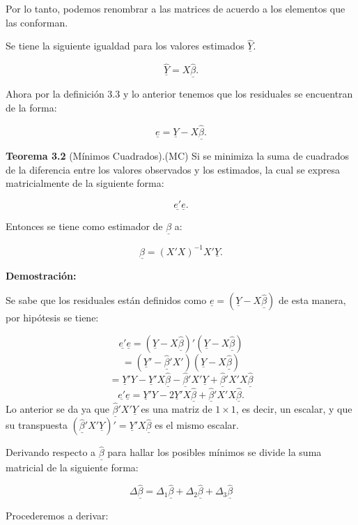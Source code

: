\documentclass[
  a4paper,
  oneside,
  openany]{book}
\begin{document}
Por lo tanto, podemos renombrar a las matrices de acuerdo a los elementos que las conforman.

Se tiene la siguiente igualdad para los valores estimados \(\underline{\hat{Y}}.\)

\[\underline{\hat{Y}}=X \underline{\hat{\beta}}.\]

Ahora por la definición 3.3 y lo anterior tenemos que los residuales se encuentran de la forma:

\[\underline{e}=\underline{Y}-X \underline{\hat{\beta}}.\]

\textbf{Teorema 3.2} (Mínimos Cuadrados).(MC) Si se minimiza la suma de cuadrados de la diferencia entre los valores observados y los estimados, la cual se expresa matricialmente de la siguiente forma:

\[\underline{e'}\underline{e}.\]

Entonces se tiene como estimador de \(\underline{\beta}\) a:

\[\underline{\hat{\beta}}=\left( X'X\right)^{-1}X'\underline{Y}.\]

\textbf{Demostración:}

Se sabe que los residuales están definidos como \(\underline{e}=\left( \underline{Y}-X \underline{\hat{\beta}}\right)\) de esta manera, por hipótesis se tiene:

\[\underline{e'}\underline{e}=\left( \underline{Y}-X \underline{\hat{\beta}}\right)'\left( \underline{Y}-X \underline{\hat{\beta}}\right)\]
\[=\left(\underline{Y}'- \underline{\hat{\beta}}'X'\right)\left( \underline{Y}-X \underline{\hat{\beta}}\right)\]
\[=\underline{Y}'Y-\underline{Y}'X\underline{\hat{\beta}}-\underline{\hat{\beta}}'X'\underline{Y}+\underline{\hat{\beta}}'X'X\underline{\hat{\beta}}\]
\[\underline{e'}\underline{e}=\underline{Y}'Y-2\underline{Y}'X\underline{\hat{\beta}}+\underline{\hat{\beta}}'X'X\underline{\hat{\beta}}.\]
Lo anterior se da ya que \(\underline{\hat{\beta}}'X'\underline{Y}\) es una matriz de \(1\times 1\), es decir, un escalar, y que su transpuesta \((\underline{\hat{\beta}}'X'\underline{Y})'=\underline{Y}'X\underline{\hat{\beta}}\) es el mismo escalar.

Derivando respecto a \(\underline{\hat{\beta}}\) para hallar los posibles mínimos se divide la suma matricial de la siguiente forma:

\[\Delta \underline{\hat\beta}=\Delta_{1} \underline{\hat{\beta}}+\Delta_{2} \underline{\hat{\beta}}+\Delta_{3} \underline{\hat{\beta}}\]

Procederemos a derivar:
\end{document}
